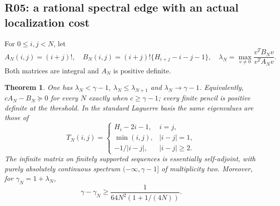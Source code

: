 \documentclass[11pt,a4paper]{article}
\newtheorem{theorem}{Theorem}[section]
\theoremstyle{definition}
\theoremstyle{remark}
\numberwithin{equation}{section}
\begin{document}
\subsection{R05: a rational spectral edge with an actual localization cost}
For $0\le i,j<N$, let
\[
 A_N(i,j)=(i+j)!,\quad
 B_N(i,j)=(i+j)!\{H_{i+j}-i-j-1\},\quad
 \lambda_N=\max_{v\ne0}\frac{v^TB_Nv}{v^TA_Nv}.
\]
Both matrices are integral and $A_N$ is positive definite.

\begin{theorem}\label{ar:spectral}
One has $\lambda_N<\gamma-1$, $\lambda_N\le\lambda_{N+1}$ and
$\lambda_N\to\gamma-1$.  Equivalently,
$cA_N-B_N\succeq0$ for every $N$ exactly when $c\ge\gamma-1$; every
finite pencil is positive definite at the threshold.  In the standard
Laguerre basis the same eigenvalues are those of
\[
 T_N(i,j)=\begin{cases}
 H_i-2i-1,&i=j,\\
 \min(i,j),&|i-j|=1,\\
 -1/|i-j|,&|i-j|\ge2.
 \end{cases}
\]
The infinite matrix on finitely supported sequences is essentially
self-adjoint, with purely absolutely continuous spectrum
$(-\infty,\gamma-1]$ of multiplicity two.  Moreover, for
$\gamma_N=1+\lambda_N$,
\begin{equation}\label{ar:spectralgap}
 \gamma-\gamma_N\ge\frac1{64N^2(1+1/(4N))}.
\end{equation}
\end{theorem}
\end{document}
